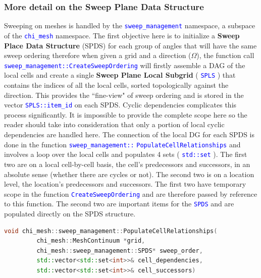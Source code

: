 \documentclass[11pt,letterpaper,titlepage]{article}
\newcommand{\xmltag}[1]{\textcolor{blue}{ \texttt{#1}} }
\numberwithin{equation}{section}
\begin{document}
\subsubsection{More detail on the Sweep Plane Data Structure}
Sweeping on meshes is handled by the \xmltag{sweep\_management} namespace, a subspace of the \xmltag{chi\_mesh} namespace. The first objective here is to initialize a \textbf{Sweep Place Data Structure} (SPDS) for each group of angles that will have the same sweep ordering therefore when given a grid and a direction ($\Omega$), the function call \xmltag{sweep\_management::CreateSweepOrdering} will firstly assemble a DAG of the local cells and create a single \textbf{Sweep Plane Local Subgrid }(\xmltag{SPLS}) that contains the indices of all the local cells, sorted topologically against the direction. This provides the ``fine-view" of sweep ordering and is stored in the vector \xmltag{SPLS::item\_id} on each SPDS. 
\newline
\newline
Cyclic dependencies complicates this process significantly. It is impossible to provide the complete scope here so the reader should take into consideration that only a portion of local cyclic dependencies are handled here.  The connection of the local DG for each SPDS is done in the function \xmltag{sweep\_management::} \xmltag{PopulateCellRelationships} and involves a loop over the local cells and populates 4 sets (\xmltag{std::set}). The first two are on a local cell-by-cell basis, the cell's predecessors and successors, in an absolute sense (whether there are cycles or not). The second two is on a location level, the location's predecessors and successors. The first two have temporary scope in the function \xmltag{CreateSweepOrdering} and are therefore passed by reference to this function. The second two are important items for the \xmltag{SPDS} and are populated directly on the SPDS structure. 

\begin{lstlisting}[language=c++]
void chi_mesh::sweep_management::PopulateCellRelationships(
         chi_mesh::MeshContinuum *grid,
         chi_mesh::sweep_management::SPDS* sweep_order,
         std::vector<std::set<int>>& cell_dependencies,
         std::vector<std::set<int>>& cell_successors)
\end{lstlisting}
\end{document}
